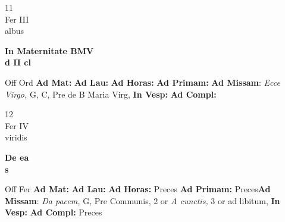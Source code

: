 \documentclass[10pt, openany]{book}
\begin{document}
        \begin{center}
            \begin{minipage}{3.5in}
                \vspace{2em}
                \begin{minipage}{0.5in}
                    {\Huge 11} \\
                    {\normalsize Fer III} \\
                    {\normalsize albus}
                \end{minipage}
                \begin{minipage}{3.0in}
                    \textbf{ \large In Maternitate BMV \\
                    \textnormal{\normalsize d II cl}} \\ 
                \end{minipage}
                \begin{justify}Off Ord
                    \textbf{Ad Mat: }
                    \textbf{Ad Lau: }
                    \textbf{Ad Horas: }
                    \textbf{Ad Primam: }\textbf{Ad Missam}: \textit{Ecce Virgo,} G, C, Pre de B Maria Virg,  
                    \textbf{In Vesp: }
                    \textbf{Ad Compl: }
                \end{justify}
            \end{minipage}
        \end{center}
    
        \begin{center}
            \begin{minipage}{3.5in}
                \vspace{2em}
                \begin{minipage}{0.5in}
                    {\Huge 12} \\
                    {\normalsize Fer IV} \\
                    {\normalsize viridis}
                \end{minipage}
                \begin{minipage}{3.0in}
                    \textbf{ \large De ea \\
                    \textnormal{\normalsize s}} \\ 
                \end{minipage}
                \begin{justify}Off Fer
                    \textbf{Ad Mat: }
                    \textbf{Ad Lau: }
                    \textbf{Ad Horas: }Preces
                    \textbf{Ad Primam: }Preces\textbf{Ad Missam}: \textit{Da pacem,} G, Pre Communis, 2 or \textit{A cunctis,} 3 or ad libitum,  
                    \textbf{In Vesp: }
                    \textbf{Ad Compl: }Preces
                \end{justify}
            \end{minipage}
        \end{center}
    
\end{document}
